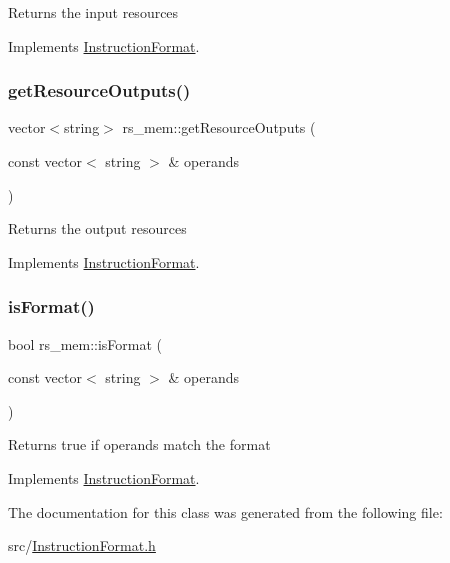 Returns the input resources 

Implements \hyperlink{classInstructionFormat_a09775d3a3c22f40a0f44504664e586e4}{Instruction\+Format}.

\mbox{\label{classrs__mem_a43c0456a0a59e714915e9d7b14e2246b}} 
\subsubsection{\texorpdfstring{get\+Resource\+Outputs()}{getResourceOutputs()}}
{\footnotesize\ttfamily vector$<$string$>$ rs\+\_\+mem\+::get\+Resource\+Outputs (\begin{DoxyParamCaption}\item[{const vector$<$ string $>$ \&}]{operands }\end{DoxyParamCaption})\hspace{0.3cm}{\ttfamily [virtual]}}

Returns the output resources 

Implements \hyperlink{classInstructionFormat_a95cd28ffb1bde59b67f676880ab10536}{Instruction\+Format}.

\mbox{\label{classrs__mem_a81ea68538cb372c59b98d269fb0708c5}} 
\subsubsection{\texorpdfstring{is\+Format()}{isFormat()}}
{\footnotesize\ttfamily bool rs\+\_\+mem\+::is\+Format (\begin{DoxyParamCaption}\item[{const vector$<$ string $>$ \&}]{operands }\end{DoxyParamCaption})\hspace{0.3cm}{\ttfamily [virtual]}}

Returns true if operands match the format 

Implements \hyperlink{classInstructionFormat_a9fdcf94dcd7d9a55ba86e7a63f04d1fe}{Instruction\+Format}.



The documentation for this class was generated from the following file\+:\begin{DoxyCompactItemize}
\item 
src/\hyperlink{InstructionFormat_8h}{Instruction\+Format.\+h}\end{DoxyCompactItemize}
